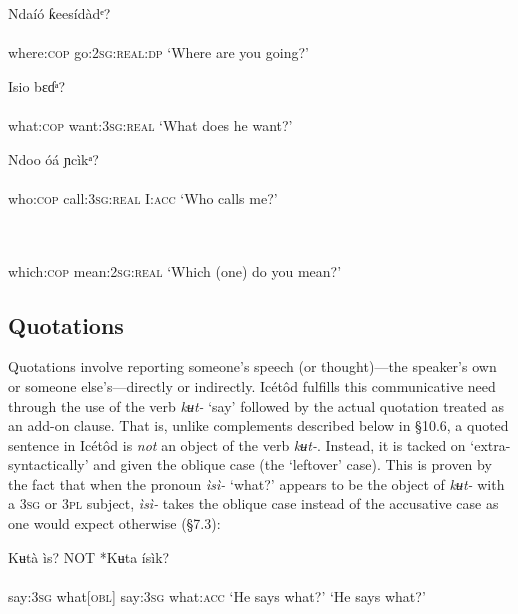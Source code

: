 \ea\label{ex:}
\gll Ndaíó   ƙeesídàdᵉ? \\
    \\
where:\textsc{cop}   go:\textsc{2sg:real:dp}
\glt ‘Where are you going?’ 
\z




\ea\label{ex:}
\gll Isio     bɛɗᵃ? \\
    \\
what:\textsc{cop}   want:\textsc{3sg:real}
\glt ‘What does he want?’ 
\z




\ea\label{ex:}
\gll Ndoo     óá       ɲcìkᵃ? \\
    \\
who:\textsc{cop}   call:\textsc{3sg:real}   I:\textsc{acc}
\glt ‘Who calls me?’ 
\z




\ea\label{ex:}
 \\
    \\
which:\textsc{cop}   mean:\textsc{2sg:real}
\glt ‘Which (one) do you mean?’ 
\z






\subsection{Quotations}


Quotations involve reporting someone’s speech (or thought)—the speaker’s own or someone else’s—directly or indirectly. Icétôd fulfills this communicative need through the use of the verb \textit{kʉt-} ‘say’ followed by the actual quotation treated as an add-on clause. That is, unlike complements described below in §10.6, a quoted sentence in Icétôd is \textit{not} an object of the verb \textit{kʉt-}. Instead, it is tacked on ‘extra-syntactically’ and given the oblique case (the ‘leftover’ case). This is proven by the fact that when the pronoun \textit{ìsì-} ‘what?’ appears to be the object of \textit{kʉt-} with a \textsc{3sg} or \textsc{3pl} subject, \textit{ìsì-} takes the oblique case instead of the accusative case as one would expect otherwise (§7.3):




\ea\label{ex:}
\gll Kʉtà     ìs?    NOT  *Kʉta   ísìk? \\
    \\
say:\textsc{3sg}   what[\textsc{obl}]    say:\textsc{3sg}   what:\textsc{acc}
\glt ‘He says what?’      ‘He says what?’ 
\z


